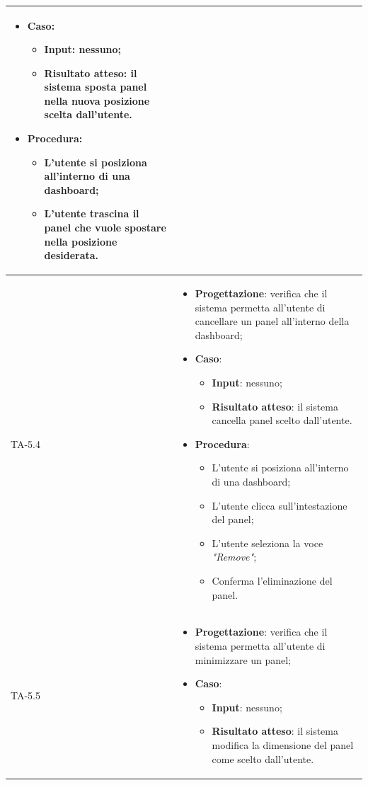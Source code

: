\begin{longtable}{|C{2.5cm}|C{13cm}|}
\begin{itemize}
	\item \textbf{Caso}: 
	\begin{itemize}
		\item \textbf{Input}: nessuno;
		\item \textbf{Risultato atteso}: il sistema sposta panel nella nuova posizione scelta dall'utente.
	\end{itemize}
	\item \textbf{Procedura}:
	\begin{itemize}
		\item L'utente si posiziona all'interno di una dashboard;
		\item L'utente trascina il panel che vuole spostare nella posizione desiderata.
	\end{itemize} 
\end{itemize} \\
\hline
{TA-5.4} &
\begin{itemize}
	\item \textbf{Progettazione}: verifica che il sistema permetta all'utente di cancellare un panel all'interno della dashboard;
	\item \textbf{Caso}: 
	\begin{itemize}
		\item \textbf{Input}: nessuno;
		\item \textbf{Risultato atteso}: il sistema cancella panel scelto dall'utente.
	\end{itemize}
	\item \textbf{Procedura}:
	\begin{itemize}
		\item L'utente si posiziona all'interno di una dashboard;
		\item L'utente clicca sull'intestazione del panel;
		\item L'utente seleziona la voce \emph{"Remove"};
		\item Conferma l'eliminazione del panel.
	\end{itemize} 
\end{itemize} \\
\hline
{TA-5.5} &
\begin{itemize}
	\item \textbf{Progettazione}: verifica che il sistema permetta all'utente di minimizzare un panel;
	\item \textbf{Caso}: 
	\begin{itemize}
		\item \textbf{Input}: nessuno;
		\item \textbf{Risultato atteso}: il sistema modifica la dimensione del panel come scelto dall'utente.

\end{itemize}
\end{itemize}
\end{longtable}
